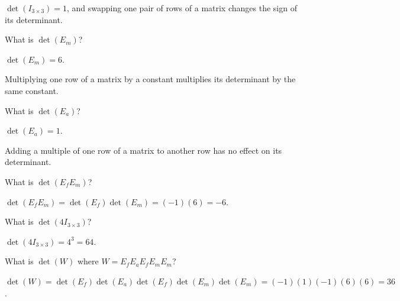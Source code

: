 \documentclass{workbook}
\begin{document}
\begin{slide}
\begin{parts}
\begin{solution}
				$\det(I_{3\times 3})=1$, and swapping one pair of rows of a matrix
				changes the sign of its determinant.
			\end{solution}
		\item What is $\det(E_m)$?
			\begin{solution}
				$\det(E_m)=6$.

				Multiplying one row of a matrix by a constant multiplies its
				determinant by the same constant.
			\end{solution}
		\item What is $\det(E_a)$?
			\begin{solution}
				$\det(E_a)=1$.

				Adding a multiple of one row of a matrix to another row has no
				effect on its determinant.
			\end{solution}
		\item What is $\det(E_fE_m)$?
			\begin{solution}[inline]
				$\det(E_fE_m)=\det(E_f)\det(E_m)=(-1)(6)=-6$.
			\end{solution}
		\item What is $\det(4I_{3\times 3})$?
			\begin{solution}[inline]
				$\det(4I_{3\times 3})=4^3=64$.
			\end{solution}
		\item What is $\det(W)$ where $W=E_fE_aE_fE_mE_m$?
			\begin{solution}
				$\det(W)=\det(E_f)\det(E_a)\det(E_f)\det(E_m)\det(E_m)=(-1)(1)(-1)(6)(6)=36$.
			\end{solution}
	\end{parts}
\end{slide}
\end{document}
